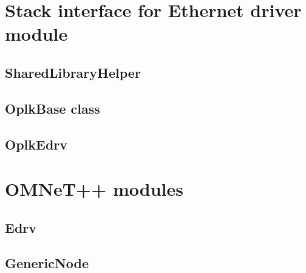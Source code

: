 \section{Stack interface for Ethernet driver module}
\label{app:simulation_stackif}

\subsection{SharedLibraryHelper}
\label{app:simulation_stackif_libhelper}



\subsection{OplkBase class}
\label{app:simulation_stackif_oplkbase}


\subsection{OplkEdrv}
\label{app:simulation_stackif_oplkedrv}



\section{OMNeT++ modules}
\label{app:simulation_sim}

\subsection{Edrv}
\label{app:simulation_sim_edrv}



\subsection{GenericNode}
\label{app:simulation_sim_generic}


